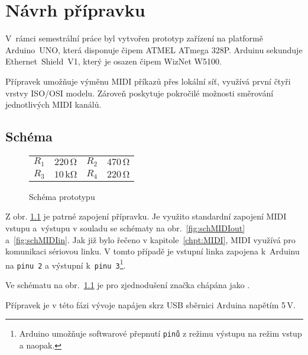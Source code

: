 \chapter{Návrh přípravku}
V~rámci semestrální práce byl vytvořen prototyp zařízení na platformě Arduino~UNO, která disponuje čipem ATMEL ATmega 328P. Arduinu sekunduje \linebreak Ethernet~Shield~V1, který je osazen čipem WizNet W5100. 

Přípravek umožňuje výměnu \acs{MIDI} příkazů přes lokální síť, využívá první čtyři vrstvy ISO/OSI modelu. Zároveň poskytuje pokročilé možnosti směrování jednotlivých \acs{MIDI} kanálů.

\section{Schéma}\label{chpt:Schema}
\begin{figure}[h]
    \centering
    
    \begin{tabular}{l c l c}
        \small
        $R_1$ & $220\,\mathrm{\Omega}$ & $R_2$ & $470\,\mathrm{\Omega}$ \\
        $R_3$ & $10\,\mathrm{k\Omega}$ & $R_4$ & $220\,\mathrm{\Omega}$
    \end{tabular}
    \caption{Schéma prototypu \cite{Indest}} 
    \label{fig:schPrototype}
\end{figure}

Z obr. \ref{fig:schPrototype} je patrné zapojení přípravku. Je využito standardní zapojení \acs{MIDI} vstupu a~výstupu v souladu se schématy na obr.~\ref{fig:schMIDIout} a~\ref{fig:schMIDIin}. Jak již bylo řečeno v kapitole~\ref{chpt:MIDI}, \acs{MIDI} využívá pro komunikaci sériovou linku. V tomto případě je vstupní linka zapojena k~Arduinu na \texttt{pinu~2} a výstupní k~\texttt{pinu~3}\footnote{Arduino umožňuje softwarové přepnutí \texttt{pinů} z režimu výstupu na režim vstup a naopak.}. 

Ve schématu na obr.~\ref{fig:schPrototype} je pro zjednodušení značka  chápána jako .

Přípravek je v této fázi vývoje napájen skrz \acs{USB} sběrnici Arduina napětím 5\,\unit{V}.


